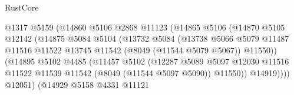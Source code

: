 \begin{lexlean}{RustCore}
\begin{coremodule}
                                        @1317
                                        @5159
                                        (@14860
                                          @5106
                                          @2868
                                          @11123
                                          (@14865
                                            @5106
                                            (@14870
                                              @5105
                                              @12142
                                              (@14875
                                                @5084
                                                @5104
                                                (@13732
                                                  @5084
                                                  (@13738
                                                    @5066
                                                    @5079
                                                    @11487
                                                    @11516
                                                    @11522
                                                    @13745
                                                    @11542
                                                    (@8049 (@11544 @5079 @5067))
                                                    @11550))
                                                (@14895
                                                  @5102
                                                  @4485
                                                  (@11457
                                                    @5102
                                                    (@12287
                                                      @5089
                                                      @5097
                                                      @12030
                                                      @11516
                                                      @11522
                                                      @11539
                                                      @11542
                                                      (@8049 (@11544 @5097 @5090))
                                                      @11550))
                                                  @14919))))
                                          @12051)
                                        (@14929
                                          @5158
                                          @4331
                                          @11121

\end{coremodule}
\end{lexlean}
